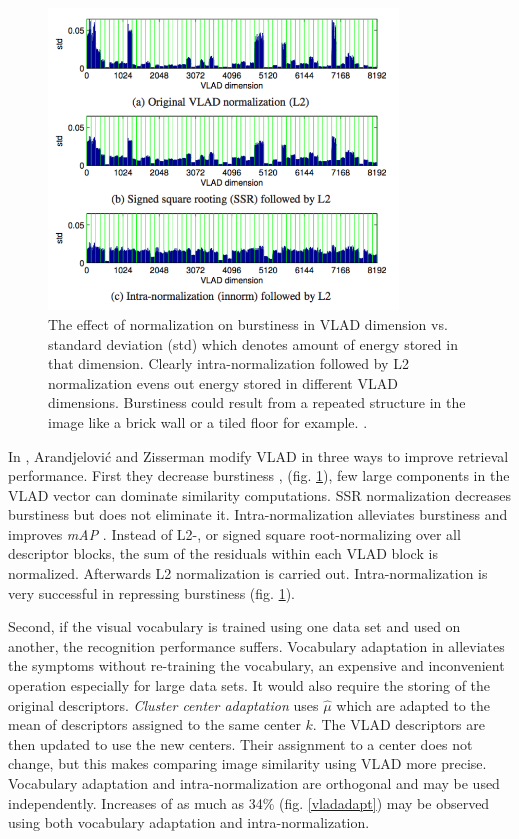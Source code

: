 \documentclass[english,12pt,a4paper,pdftex,elec,utf8]{aaltothesis}
\begin{document}
\begin{figure}[htb]
\begin{center}
\includegraphics[height=8cm]{figures/vladnorm}
\end{center}
\caption{The effect of normalization on burstiness in VLAD dimension vs. standard deviation (std) which denotes amount of energy stored in that dimension. Clearly intra-normalization followed by L2 normalization evens out energy stored in different VLAD dimensions. Burstiness could result from a repeated structure in the image like a brick wall or a tiled floor for example. \cite{Arandjelovic2013}.}
\label{vladburstiness}
\end{figure}

In \cite{Arandjelovic2013}, Arandjelovi\'{c} and Zisserman modify VLAD in three ways to improve retrieval performance. First they decrease burstiness \cite{Jegou2009}, \cite{Delhumeau2013} (fig. \ref{vladburstiness}), few large components in the VLAD vector can dominate similarity computations. SSR normalization decreases burstiness but does not eliminate it. Intra-normalization alleviates burstiness and improves \emph{mAP} \cite{Arandjelovic2013}. Instead of L2-, or signed square root-normalizing over all descriptor blocks, the sum of the residuals within each VLAD block is normalized. Afterwards L2 normalization is carried out. Intra-normalization is very successful in repressing burstiness (fig. \ref{vladburstiness}).

Second, if the visual vocabulary is trained using one data set and used on another, the recognition performance suffers. Vocabulary adaptation in \cite{Arandjelovic2013} alleviates the symptoms without re-training the vocabulary, an expensive and inconvenient operation especially for large data sets. It would also require the storing of the original descriptors. \emph{Cluster center adaptation} uses $\hat{\mu}$ which are adapted to the mean of descriptors assigned to the same center $k$. The VLAD descriptors are then updated to use the new centers. Their assignment to a center does not change, but this makes comparing image similarity using VLAD more precise. Vocabulary adaptation and intra-normalization are orthogonal and may be used independently. Increases of as much as 34\% (fig. \ref{vladadapt}) may be observed using both vocabulary adaptation and intra-normalization. \cite{Arandjelovic2013}
\end{document}
